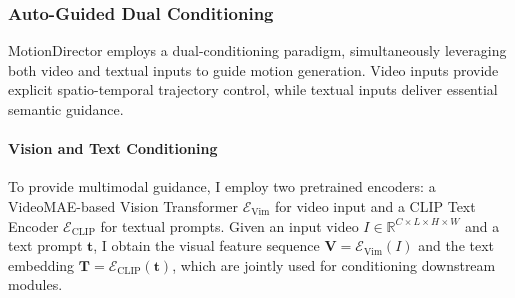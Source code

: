 \documentclass[a4paper,12pt]{article}
\begin{document}


\subsubsection{Auto-Guided Dual Conditioning}

MotionDirector employs a dual-conditioning paradigm, simultaneously leveraging both video and textual inputs to guide motion generation. Video inputs provide explicit spatio-temporal trajectory control, while textual inputs deliver essential semantic guidance.


\paragraph{Vision and Text Conditioning}
To provide multimodal guidance, I employ two pretrained encoders: a VideoMAE-based Vision Transformer $\mathcal{E}_{\text{Vim}}$ \cite{wang2023videomae} for video input and a CLIP Text Encoder $\mathcal{E}_{\text{CLIP}}$ for textual prompts. Given an input video $I \in \mathbb{R}^{C \times L \times H \times W}$ and a text prompt $\mathbf{t}$, I obtain the visual feature sequence $\mathbf{V} = \mathcal{E}_{\text{Vim}}(I)$ and the text embedding $\mathbf{T} = \mathcal{E}_{\text{CLIP}}(\mathbf{t})$, which are jointly used for conditioning downstream modules.
\end{document}
